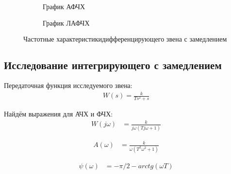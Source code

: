 \documentclass[a4paper, 11pt]{article}
\begin{document}
\begin{figure}[h!]
    \begin{subfigure}{0.5\textwidth}
        \centering
        \caption{График АФЧХ}
    \end{subfigure}
    \begin{subfigure}{0.5\textwidth}
        \centering
        \caption{График ЛАФЧХ}
    \end{subfigure}
    \caption{Частотные характеристикидифференцирующего звена с замедлением}
\end{figure}

\newpage
\begin{center}
	\section{Исследование интегрирующего с замедлением }
\end{center}

\par 
Передаточная функция исследуемого звена:
\begin{align}
	W(s)=\frac{k}{Ts^2 + s}
\end{align}
\par 
Найдём выражения для АЧХ и ФЧХ:
\begin{align}
	W(j\omega) & = \frac{k}{j\omega(Tj\omega+1)}
\end{align}

\begin{align}
	A(\omega) & = \frac{k}{\omega(T^2\omega^2+1 )}
\end{align}

\begin{align}
\psi(\omega) & = -\pi/2-arctg(\omega T)
\end{align}
\end{document}
